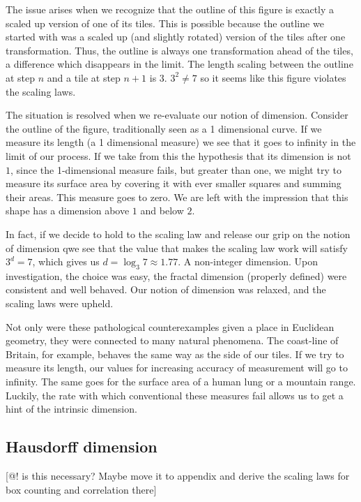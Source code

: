 \documentclass[10pt]{article}
\begin{document}
The issue arises when we recognize that the outline of this figure is exactly a scaled up version of one of its tiles. This is possible because the outline we started with was a scaled up (and slightly rotated) version of the tiles after one transformation. Thus, the outline is always one transformation ahead of the tiles, a difference which disappears in the limit. The length scaling between the outline at step $n$ and a tile at step $n+1$ is $3$. $3^2 \neq 7$ so it seems like this figure violates the scaling laws. 

The situation is resolved when we re-evaluate our notion of dimension. Consider the outline of the figure, traditionally seen as a 1 dimensional curve. If we measure its length (a 1 dimensional measure) we see that it goes to infinity in the limit of our process. If we take from this the hypothesis that its dimension is not $1$, since the 1-dimensional measure fails, but greater than one, we might try to measure its surface area by covering it with ever smaller squares and summing their areas. This measure goes to zero. We are left with the impression that this shape has a dimension above $1$ and below $2$.

In fact, if we decide to hold to the scaling law and release our grip on the notion of dimension qwe see that the value that makes the scaling law work will satisfy $3^d = 7$, which gives us  $d = \log_3 7 \approx 1.77$. A non-integer dimension. Upon investigation, the choice was easy, the fractal dimension (properly defined) were consistent and well behaved. Our notion of dimension was relaxed, and the scaling laws were upheld.

Not only were these pathological counterexamples given a place in Euclidean geometry, they were connected to many natural phenomena. The coast-line of Britain, for example, behaves the same way as the side of our tiles. If we try to measure its length, our values for increasing accuracy of measurement will go to infinity. The same goes for the surface area of a human lung or a mountain range. Luckily, the rate with which conventional these measures fail allows us to get a hint of the intrinsic dimension.

\subsection{Hausdorff dimension}

[@! is this necessary? Maybe move it to appendix and derive the scaling laws for box counting and correlation there]  
\end{document}
